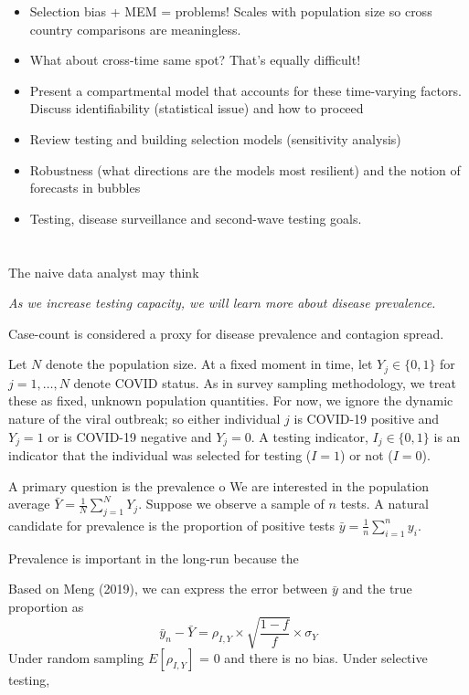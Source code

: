 \documentclass[12pt]{article}
\numberwithin{equation}{section}
\theoremstyle{plain}
\begin{document}
\begin{itemize}
	\item Selection bias + MEM = problems! Scales with population size so cross country comparisons are meaningless.
	\item What about cross-time same spot?  That's equally difficult!
	\item Present a compartmental model that accounts for these time-varying factors.  Discuss identifiability (statistical issue) and how to proceed
	\item Review testing and building selection models (sensitivity analysis)
	\item Robustness (what directions are the models most resilient) and the notion of forecasts in bubbles
	\item Testing, disease surveillance and second-wave testing goals.
\end{itemize}

\section{}

The naive data analyst may think
\begin{center}
\emph{As we increase testing capacity, we will learn more about disease prevalence.}
\end{center}

Case-count is considered a proxy for disease prevalence and contagion spread.

Let $N$ denote the population size.  At a fixed moment in time, let $Y_j \in \{ 0,1\}$ for $j=1,\ldots, N$ denote COVID status.  As in survey sampling methodology, we treat these as fixed, unknown population quantities. For now, we ignore the dynamic nature of the viral outbreak; so either individual $j$ is COVID-19 positive and $Y_j=1$ or is COVID-19 negative and $Y_j=0$. A testing indicator, $I_j \in \{0,1\}$ is an indicator that the individual was selected for testing ($I = 1$) or not ($I=0$).

A primary question is the prevalence o
We are interested in the population average $\bar Y = \frac{1}{N} \sum_{j=1}^N Y_j$. Suppose we observe a sample of $n$ tests.  A natural candidate for prevalence is the proportion of positive tests $\bar y = \frac{1}{n} \sum_{i=1}^n y_i$.

Prevalence is important in the long-run because the

Based on Meng (2019), we can express the error between $\bar y$ and the true proportion as
$$
\bar y_n - \bar Y =  \rho_{I, Y} \times \sqrt{\frac{1-f}{f}} \times \sigma_Y
$$
Under random sampling $E [ \rho_{I,Y} ]$ = 0 and there is no bias.  Under selective testing,
\end{document}
